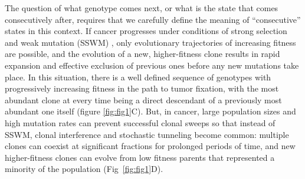 \documentclass[a4paper,10pt]{article}
\begin{document}
The question of what genotype comes next, or what is the state that comes
consecutively after, requires that we carefully define the meaning of
``consecutive'' states in this context. If cancer progresses under
conditions of strong selection and weak mutation (SSWM)
\cite{gillespie1983}, only evolutionary trajectories of increasing fitness
are possible, and the evolution of a new, higher-fitness clone results in
rapid expansion and effective exclusion of previous ones before any new
mutations take place. In this situation, there is a well defined sequence
of genotypes with progressively increasing fitness in the path to tumor
fixation, with the most abundant clone at every time being a direct
descendant of a previously most abundant one itself (figure
\ref{fig:fig1}C). But, in cancer, large population sizes and high mutation
rates can prevent successful clonal sweeps \cite{nichol2019a, zhao2016} so
that instead of SSWM, clonal interference and stochastic tunneling
\cite{devisser_empirical_2014,szendro_predictability_2013,sniegowski_beneficial_2010,
  wodarz_dynamics_2014} become common: multiple clones can coexist at
significant fractions for prolonged periods of time, and new
higher-fitness clones can evolve from low fitness parents that represented
a minority of the population
(Fig~\ref{fig:fig1}D). %
\end{document}
